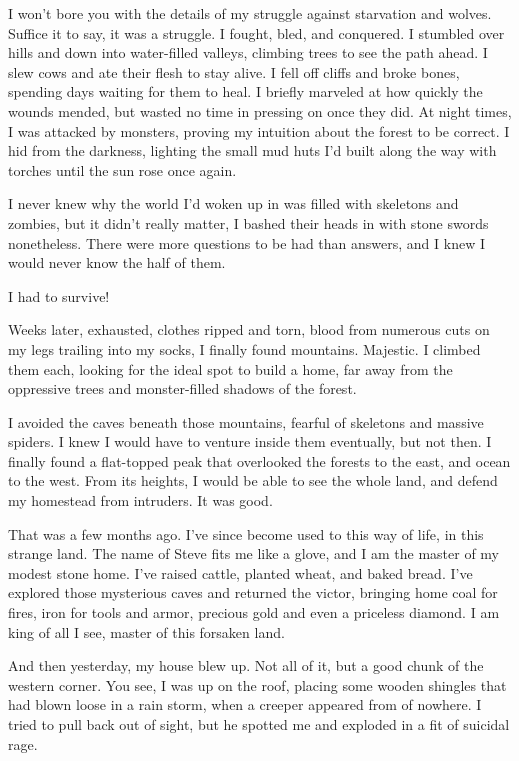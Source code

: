 \documentclass[
]{book}
\begin{document}
I won't bore you with the details of my struggle against starvation and wolves. Suffice it to say, it was a struggle. I fought, bled, and conquered. I stumbled over hills and down into water-filled valleys, climbing trees to see the path ahead. I slew cows and ate their flesh to stay alive. I fell off cliffs and broke bones, spending days waiting for them to heal. I briefly marveled at how quickly the wounds mended, but wasted no time in pressing on once they did. At night times, I was attacked by monsters, proving my intuition about the forest to be correct. I hid from the darkness, lighting the small mud huts I'd built along the way with torches until the sun rose once again.

I never knew why the world I'd woken up in was filled with skeletons and zombies, but it didn't really matter, I bashed their heads in with stone swords nonetheless. There were more questions to be had than answers, and I knew I would never know the half of them.

I had to survive!

Weeks later, exhausted, clothes ripped and torn, blood from numerous cuts on my legs trailing into my socks, I finally found mountains. Majestic. I climbed them each, looking for the ideal spot to build a home, far away from the oppressive trees and monster-filled shadows of the forest.

I avoided the caves beneath those mountains, fearful of skeletons and massive spiders. I knew I would have to venture inside them eventually, but not then. I finally found a flat-topped peak that overlooked the forests to the east, and ocean to the west. From its heights, I would be able to see the whole land, and defend my homestead from intruders. It was good.

That was a few months ago. I've since become used to this way of life, in this strange land. The name of Steve fits me like a glove, and I am the master of my modest stone home. I've raised cattle, planted wheat, and baked bread. I've explored those mysterious caves and returned the victor, bringing home coal for fires, iron for tools and armor, precious gold and even a priceless diamond. I am king of all I see, master of this forsaken land.

And then yesterday, my house blew up. Not all of it, but a good chunk of the western corner. You see, I was up on the roof, placing some wooden shingles that had blown loose in a rain storm, when a creeper appeared from of nowhere. I tried to pull back out of sight, but he spotted me and exploded in a fit of suicidal rage.
\end{document}
